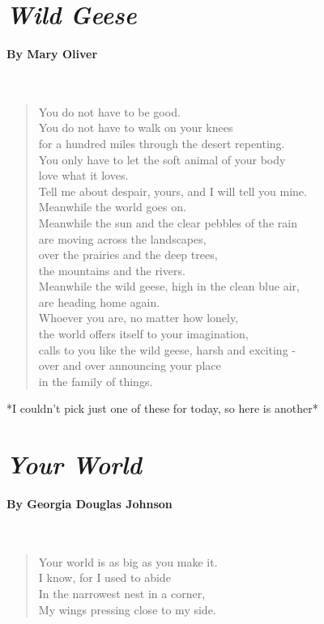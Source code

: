 \documentclass[11pt, letterpaper]{memoir}
\begin{document}
{\section*{\emph{Wild Geese}}
\paragraph{By Mary Oliver}~
\begin{verse}
	You do not have to be good.\\
	You do not have to walk on your knees\\
	for a hundred miles through the desert repenting.\\
	You only have to let the soft animal of your body\\
	love what it loves.\\
	Tell me about despair, yours, and I will tell you mine.\\
	Meanwhile the world goes on.\\
	Meanwhile the sun and the clear pebbles of the rain\\
	are moving across the landscapes,\\
	over the prairies and the deep trees,\\
	the mountains and the rivers.\\
	Meanwhile the wild geese, high in the clean blue air,\\
	are heading home again.\\
	Whoever you are, no matter how lonely,\\
	the world offers itself to your imagination,\\
	calls to you like the wild geese, harsh and exciting -\\
	over and over announcing your place\\
	in the family of things.
\end{verse}

\vspace{2em}
*I couldn't pick just one of these for today, so here is another*
\section*{\emph{Your World}}
\paragraph{By Georgia Douglas Johnson}~
\begin{verse}
	Your world is as big as you make it.\\
	I know, for I used to abide\\
	In the narrowest nest in a corner,\\
	My wings pressing close to my side.
	

\end{verse}}
\end{document}
